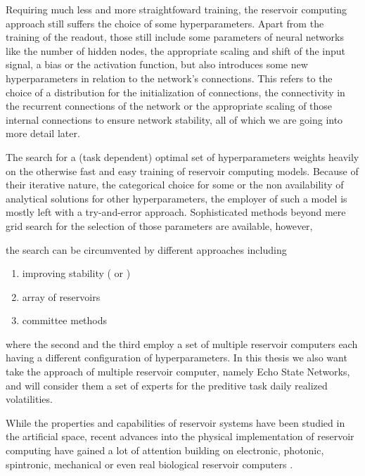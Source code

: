 Requiring much less and more straightfoward training, the reservoir computing approach still suffers the choice of some hyperparameters. Apart from the training of the readout, those still include some parameters of neural networks like the number of hidden nodes, the appropriate scaling and shift of the input signal, a bias or the activation function, but also introduces some new hyperparameters in relation to the network's connections. This refers to the choice of a distribution for the initialization of connections, the connectivity in the recurrent connections of the network or the appropriate scaling of those internal connections to ensure network stability, all of which we are going into more detail later.

The search for a (task dependent) optimal set of hyperparameters weights heavily on the otherwise fast and easy training of reservoir computing models. Because of their iterative nature, the categorical choice for some or the non availability of analytical solutions for other hyperparameters, the employer of such a model is mostly left with a try-and-error approach. Sophisticated methods beyond mere grid search for the selection of those parameters are available, however,

the search can be circumvented by different approaches including
\begin{enumerate}
    \item improving stability (\cite{Verzelli2019} or \cite{Jarvis2010ExtendingStability})
    \item array of reservoirs \citep{Grigortega2016ParallelRC}
    \item committee methods \citep{StanekCommitteeMethods}
\end{enumerate}
where the second and the third employ a set of multiple reservoir computers each having a different configuration of hyperparameters. In this thesis we also want take the approach of multiple reservoir computer, namely Echo State Networks, and will consider them a set of experts for the preditive task daily realized volatilities.

While the properties and capabilities of reservoir systems have been studied in the artificial space, recent advances into the physical implementation of reservoir computing have gained a lot of attention building on electronic, photonic, spintronic, mechanical or even real biological reservoir computers \citep{Tanaka2019PhysicalRC}.


